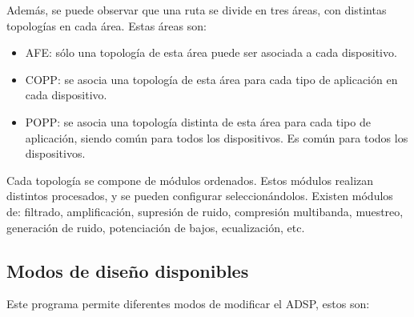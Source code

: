 Además, se puede observar que una ruta se divide en tres áreas, con distintas topologías en cada área. Estas áreas son:
\begin{itemize}
	\item{\gls{AFE}: sólo una topología de esta área puede ser asociada a cada dispositivo.}
	\item{\gls{COPP}: se asocia una topología de esta área para cada tipo de aplicación en cada dispositivo.}
	\item{\gls{POPP}: se asocia una topología distinta de esta área para cada tipo de aplicación, siendo común para todos los dispositivos. Es común para todos los dispositivos.}
\end{itemize}

Cada topología se compone de módulos ordenados. Estos módulos realizan distintos procesados, y se pueden configurar seleccionándolos. Existen módulos de: filtrado, amplificación, supresión de ruido, compresión multibanda, muestreo, generación de ruido, potenciación de bajos, ecualización, etc.

\subsection{Modos de diseño disponibles}
Este programa permite diferentes modos de modificar el \gls{ADSP}, estos son: 
 
